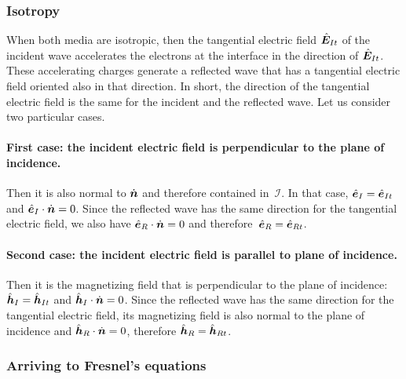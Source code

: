 
\subsubsection{Isotropy}
\label{sec:complex_fresnel_isotropy}

When both media are isotropic, then the tangential electric field $\hat{\bm{E}}_{I t}$ of the incident wave accelerates the electrons at the interface in the direction of $\hat{\bm{E}}_{I t}$.
These accelerating charges generate a reflected wave that has a tangential electric field oriented also in that direction.
In short, the direction of the tangential electric field is the same for the incident and the reflected wave.
Let us consider two particular cases.

\paragraph{First case: the incident electric field is perpendicular to the plane of incidence.}
Then it is also normal to $\dot{\bm{n}}$ and therefore contained in~$\mathcal{I}$.
In that case, $\hat{\bm{e}}_I = \hat{\bm{e}}_{I t}$ and $\hat{\bm{e}}_I\cdot\dot{\bm{n}}=0$.
Since the reflected wave has the same direction for the tangential electric field, we also have $\hat{\bm{e}}_R\cdot\dot{\bm{n}}=0$ and therefore~$\hat{\bm{e}}_R = \hat{\bm{e}}_{R t}$.

\paragraph{Second case: the incident electric field is parallel to plane of incidence.} Then it is the magnetizing field that is perpendicular to the plane of incidence: $\hat{\bm{h}}_I = \hat{\bm{h}}_{I t}$ and $\hat{\bm{h}}_I\cdot\dot{\bm{n}}=0$.
Since the reflected wave has the same direction for the tangential electric field, its magnetizing field is also normal to the plane of incidence and $\hat{\bm{h}}_R\cdot\dot{\bm{n}}=0$, therefore $\hat{\bm{h}}_R = \hat{\bm{h}}_{R t}$.




\subsubsection{Arriving to Fresnel's equations}

